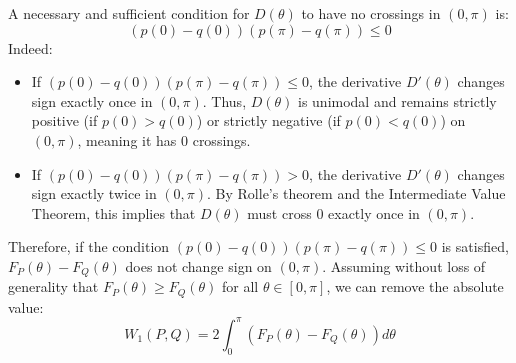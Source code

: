 \documentclass[11pt,a4paper]{article}
\begin{document}
A necessary and sufficient condition for $D(\theta)$ to have no crossings in $(0, \pi)$ is:
\begin{equation}
(p(0) - q(0))(p(\pi) - q(\pi)) \le 0
\end{equation}
Indeed:
\begin{itemize}
    \item If $(p(0) - q(0))(p(\pi) - q(\pi)) \le 0$, the derivative $D'(\theta)$ changes sign exactly once in $(0, \pi)$. Thus, $D(\theta)$ is unimodal and remains strictly positive (if $p(0) > q(0)$) or strictly negative (if $p(0) < q(0)$) on $(0, \pi)$, meaning it has 0 crossings.
    \item If $(p(0) - q(0))(p(\pi) - q(\pi)) > 0$, the derivative $D'(\theta)$ changes sign exactly twice in $(0, \pi)$. By Rolle's theorem and the Intermediate Value Theorem, this implies that $D(\theta)$ must cross $0$ exactly once in $(0, \pi)$.
\end{itemize}
Therefore, if the condition $(p(0) - q(0))(p(\pi) - q(\pi)) \le 0$ is satisfied, $F_P(\theta) - F_Q(\theta)$ does not change sign on $(0, \pi)$. Assuming without loss of generality that $F_P(\theta) \geq F_Q(\theta)$ for all $\theta \in [0, \pi]$, we can remove the absolute value:
\begin{equation}
W_1(P, Q) = 2 \int_0^\pi (F_P(\theta) - F_Q(\theta)) d\theta
\end{equation}
\end{document}
